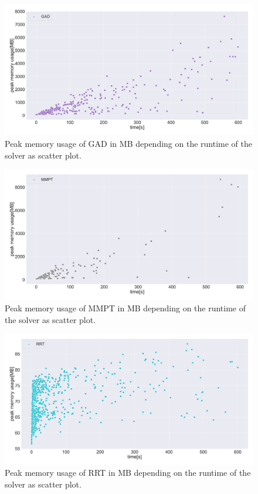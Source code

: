 \begin{figure}[htpb]
\centering
\includegraphics[width=\textwidth]{figures/plots/heuristic_solvers_i1/gad_i1_peek_memory_usage_over_time.pdf}
\caption[Memory usage of GAD]{Peak memory usage of GAD in MB depending on the runtime of the solver as scatter plot.}
\label{fig:gad_i1_peek_memory_usage_over_time}
\end{figure}

\begin{figure}[htpb]
\centering
\includegraphics[width=\textwidth]{figures/plots/heuristic_solvers_i1/mmpt_i1_peek_memory_usage_over_time.pdf}
\caption[Memory usage of MMPT]{Peak memory usage of MMPT in MB depending on the runtime of the solver as scatter plot.}
\label{fig:mmpt_i1_peek_memory_usage_over_time}
\end{figure}

\begin{figure}[htpb]
\centering
\includegraphics[width=\textwidth]{figures/plots/heuristic_solvers_i1/rrt_i1_peek_memory_usage_over_time.pdf}
\caption[Memory usage of RRT]{Peak memory usage of RRT in MB depending on the runtime of the solver as scatter plot.}
\label{fig:rrt_i1_peek_memory_usage_over_time}
\end{figure}

